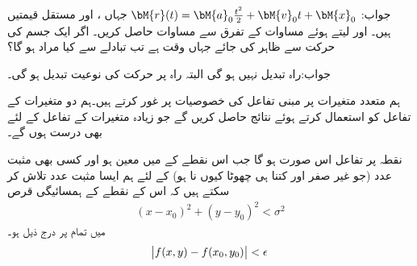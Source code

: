 جواب:
$\bM{r}(t)=\bM{a}_0\tfrac{t^2}{2}+\bM{v}_0t+\bM{x}_0$
جہاں ،  اور  مستقل قیمتیں ہیں۔
 اور  لیتے ہوئے مساوات  کے تفرق  سے مساوات  حاصل کریں۔
اگر ایک جسم کی حرکت  سے ظاہر کی جائے جہاں  وقت ہے تب  تبادلے سے کیا مراد ہو گا؟

جواب:راہ تبدیل نہیں ہو گی البتہ راہ پر حرکت کی نوعیت تبدیل ہو گی۔

ہم متعدد متغیرات پر مبنی تفاعل کی خصوصیات پر غور کرتے ہیں۔ہم دو متغیرات کے تفاعل کو استعمال کرتے ہوئے  نتائج حاصل کریں گے جو زیادہ متغیرات کے تفاعل کے لئے بھی درست ہوں گے۔

نقطہ  پر تفاعل   اس صورت  ہو گا جب اس نقطے کے  میں  معین ہو اور کسی بھی مثبت عدد  (جو غیر صفر اور کتنا ہی چھوٹا کیوں نا ہو) کے لئے ہم ایسا مثبت عدد  تلاش کر سکتے ہیں کہ اس کے نقطے کے ہمسائیگی  قرص 
\begin{align}
(x-x_0)^2+(y-y_0)^2<\sigma^2
\end{align}
میں تمام  پر درج ذیل ہو۔
\begin{align}
\abs{f(x,y)-f(x_0,y_0)}<\epsilon
\end{align}


